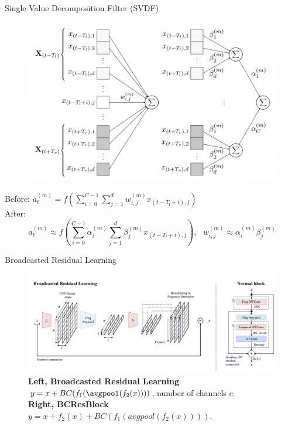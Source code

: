 \begin{frame}{Single Value Decomposition Filter (SVDF)}
    \begin{figure}
    	\centering
    	\includegraphics[width=0.65\linewidth]{figs/svdf_kws.png}
    \end{figure}

Before: 
$a_{t}^{(m)} = f\left(\sum_{i=0}^{C-1}\sum_{j=1}^{d}w_{i,j}^{(m)}x_{(t-T_{l}+i),j}\right)$\\
After:
$$a_{t}^{(m)}\approx f\left(\sum_{i=0}^{C-1}\alpha_{i}^{(m)}\sum_{j=1}^{d}\beta_{j}^{(m)}x_{(t-T_{l}+i),j}\right),~~~{w}_{i,j}^{\left(m\right)}\approx{\alpha}_{i}^{\left(m\right)}\beta_{j}^{\left(m\right)}$$


\end{frame}
\begin{frame}{Broadcasted Residual Learning}
    \begin{figure}
    	\centering
    	\includegraphics[width=0.99\linewidth]{figs/broadcasted_residual_kws.png}
    	\caption{\textbf{Left, Broadcasted Residual Learning} $y=x+B C(f_{1}(\avgpool(f_{2}(x))))$, number of channels $c$. \\ \textbf{Right, BCResBlock} $y=x+f_{2}(x)+B C(f_{1}(avgpool(f_{2}(x)))).$}
    \end{figure}
        
    
\end{frame}
